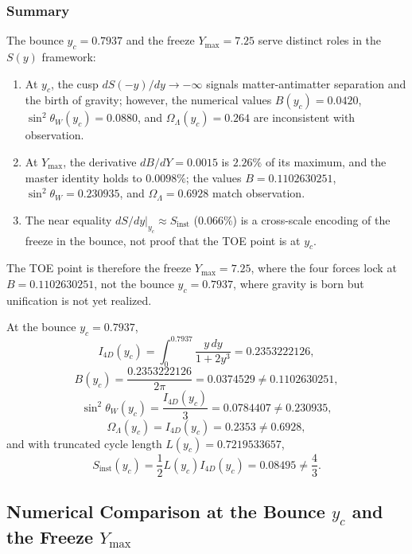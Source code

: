 \documentclass[12pt,oneside,openany]{book}
\begin{document}
\subsubsection{Summary}

The bounce $y_c = 0.7937$ and the freeze $Y_{\max} = 7.25$ serve distinct roles in the $S(y)$ framework:
\begin{enumerate}
\item At $y_c$, the cusp $dS(-y)/dy \to -\infty$ signals matter-antimatter separation and the birth of gravity; however, the numerical values $B(y_c) = 0.0420$, $\sin^2\theta_W(y_c) = 0.0880$, and $\Omega_\Lambda(y_c) = 0.264$ are inconsistent with observation.
\item At $Y_{\max}$, the derivative $dB/dY = 0.0015$ is $2.26\%$ of its maximum, and the master identity holds to $0.0098\%$; the values $B = 0.1102630251$, $\sin^2\theta_W = 0.230935$, and $\Omega_\Lambda = 0.6928$ match observation.
\item The near equality $dS/dy|_{y_c} \approx S_{\mathrm{inst}}$ (0.066\%) is a cross-scale encoding of the freeze in the bounce, not proof that the TOE point is at $y_c$.
\end{enumerate}
The TOE point is therefore the freeze $Y_{\max} = 7.25$, where the four forces lock at $B = 0.1102630251$, not the bounce $y_c = 0.7937$, where gravity is born but unification is not yet realized.

At the bounce $y_c = 0.7937$,
\begin{equation}
I_{4D}(y_c) = \int_0^{0.7937} \frac{y\,dy}{1 + 2y^3} = 0.2353222126,
\label{eq:I4D-yc}
\end{equation}
\begin{equation}
B(y_c) = \frac{0.2353222126}{2\pi} = 0.0374529 \neq 0.1102630251,
\label{eq:B-yc}
\end{equation}
\begin{equation}
\sin^2\theta_W(y_c) = \frac{I_{4D}(y_c)}{3} = 0.0784407 \neq 0.230935,
\label{eq:sin2-yc}
\end{equation}
\begin{equation}
\Omega_\Lambda(y_c) = I_{4D}(y_c) = 0.2353 \neq 0.6928,
\label{eq:OmegaL-yc}
\end{equation}
and with truncated cycle length $L(y_c) = 0.7219533657$,
\begin{equation}
S_{\mathrm{inst}}(y_c) = \frac{1}{2}L(y_c)I_{4D}(y_c) = 0.08495 \neq \frac{4}{3}.
\label{eq:Sinst-yc}
\end{equation}

\subsection{Numerical Comparison at the Bounce $y_c$ and the Freeze $Y_{\max}$}
\label{sec:numerical-comparison-table}
\end{document}
